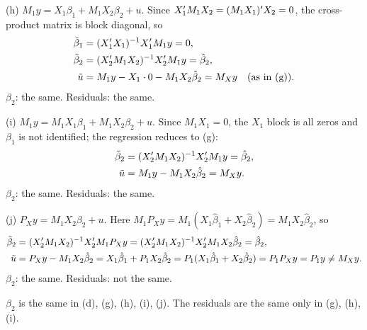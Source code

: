 \documentclass[11pt]{article}
\begin{document}
\medskip\noindent(h) $M_{1}y = X_{1}\beta_{1} + M_{1}X_{2}\beta_{2} + u$.
Since $X_{1}^{\prime} M_{1}X_{2} = (M_{1}X_{1})^{\prime} X_{2} = 0$, the cross-product matrix is block diagonal, so
\begin{align*}
  \tilde\beta_{1} &= (X_{1}^{\prime} X_{1})^{-1}X_{1}^{\prime} M_{1}y = 0,\\
  \tilde\beta_{2} &= (X_{2}^{\prime} M_{1}X_{2})^{-1}X_{2}^{\prime} M_{1}y = \hat\beta_{2},\\
  \tilde u &= M_{1}y - X_{1}\cdot 0 - M_{1}X_{2}\hat\beta_{2} = M_{X}y \quad\text{(as in (g))}.
\end{align*}
$\beta_{2}$: the same. Residuals: the same.

\medskip\noindent(i) $M_{1}y = M_{1}X_{1}\beta_{1} + M_{1}X_{2}\beta_{2} + u$.
Since $M_{1}X_{1} = 0$, the $X_{1}$ block is all zeros and $\beta_{1}$ is not identified; the regression reduces to (g):
\begin{align*}
  \tilde\beta_{2} &= (X_{2}^{\prime} M_{1}X_{2})^{-1}X_{2}^{\prime} M_{1}y = \hat\beta_{2},\\
  \tilde u &= M_{1}y - M_{1}X_{2}\hat\beta_{2} = M_{X}y.
\end{align*}
$\beta_{2}$: the same. Residuals: the same.

\medskip\noindent(j) $P_{X}y = M_{1}X_{2}\beta_{2} + u$.
Here $M_{1}P_{X}y = M_{1}(X_{1}\hat\beta_{1} + X_{2}\hat\beta_{2}) = M_{1}X_{2}\hat\beta_{2}$, so
\begin{align*}
  \tilde\beta_{2} &= (X_{2}^{\prime} M_{1}X_{2})^{-1}X_{2}^{\prime} M_{1}P_{X}y = (X_{2}^{\prime} M_{1}X_{2})^{-1}X_{2}^{\prime} M_{1}X_{2}\hat\beta_{2} = \hat\beta_{2},\\
  \tilde u &= P_{X}y - M_{1}X_{2}\hat\beta_{2} = X_{1}\hat\beta_{1} + P_{1}X_{2}\hat\beta_{2} = P_{1}(X_{1}\hat\beta_{1} + X_{2}\hat\beta_{2}) = P_{1}P_{X}y = P_{1}y \neq M_{X}y.
\end{align*}
$\beta_{2}$: the same. Residuals: not the same.

\medskip\noindent
$\beta_{2}$ is the same in (d), (g), (h), (i), (j). The residuals are the same only in (g), (h), (i).
\end{document}
